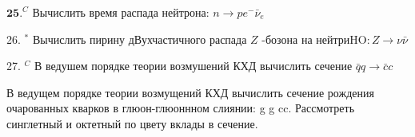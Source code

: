 \documentclass[a4paper,12pt]{article} %
\begin{document}
\begin{ttask}

$\mathbf{2 5 .}^{C}$ Вычислить время распада нейтрона: $n \rightarrow p e^{-} \bar{\nu}_{e}$


\end{ttask}



\begin{ttask}

26. $^{*}$ Вычислить пирину дВухчастичного распада $Z$ -бозона на нейтри$\mathrm{HO}: Z \rightarrow \nu \bar{\nu}$


\end{ttask}



\begin{ttask}

27. $^{C}$ В ведушем порядке теории возмушений КХД вычислить сечение
$\bar{q} q \rightarrow \bar{c} c$


\end{ttask}



\begin{ttask}

В ведущем порядке теории возмущений КХД вычислить сечение рождения очарованных кварков в глюон-глюоннном слиянии: g g  cc. Рассмотреть синглетный и октетный по цвету вклады в сечение. 



















\end{ttask}





















\end{document}
